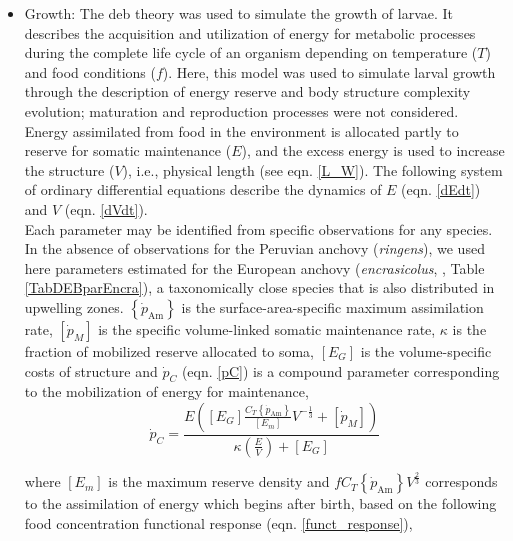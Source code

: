 \begin{itemize}

\item Growth: The \acrshort{deb} theory \citep{Kooi2009} was used to simulate the growth of larvae. It describes the acquisition and utilization of energy for metabolic processes during the complete life cycle of an organism depending on temperature ($T$) and food conditions ($f$). Here, this model was used to simulate larval growth through the description of energy reserve and body structure complexity evolution; maturation and reproduction processes were not considered. Energy assimilated from food in the environment is allocated partly to reserve for somatic maintenance ($E$), and the excess energy is used to increase the structure ($V$), i.e., physical length (see eqn. \ref{L_W}). The following system of ordinary differential equations describe the dynamics of $E$ (eqn. \ref{dEdt}) and $V$ (eqn. \ref{dVdt}).\\

Each parameter may be identified from specific observations for any species. In the absence of observations for the Peruvian anchovy (\textit{\gls{ringens}}), we used here parameters estimated for the European anchovy (\textit{\gls{encrasicolus}}, \cite{PethRoos2013}	, Table \ref{TabDEBparEncra}), a taxonomically close species that is also distributed in upwelling zones. $\left \{ \dot{p}_\mathrm{Am} \right \}$ is the surface-area-specific maximum assimilation rate, $\left [ \dot{p}_{M} \right ]$ is the specific volume-linked somatic maintenance rate, $\kappa$ is the fraction of mobilized reserve allocated to soma, ${\left [ E_{G} \right ]}$ is the volume-specific costs of structure and $\dot{p}_{C}$ (eqn. \ref{pC}) is a compound parameter corresponding to the mobilization of energy for maintenance,\\

\begin{equation}
	\dot{p}_{C} = \frac
					   {E\left ( \left [ E_{G} \right ] \frac{C_{T}\left \{ \dot{p}_\mathrm{Am} \right \}}{\left [ E_{m} \right ]} V^{-\frac{1}{3}}+\left [ \dot{p}_{M} \right ]\right )}
					   {\kappa\left ( \frac{E}{V} \right ) + \left [ E_{G} \right ]}
	\label{pC}
\end{equation}

where $\left[ E_{m} \right]$ is the maximum reserve density and $fC_{T}\left \{ \dot{p}_\mathrm{Am} \right \}V^{\frac{2}{3}}$ corresponds to the assimilation of energy which begins after birth, based on the following food concentration functional response (eqn. \ref{funct_response}),\\


\end{itemize}
